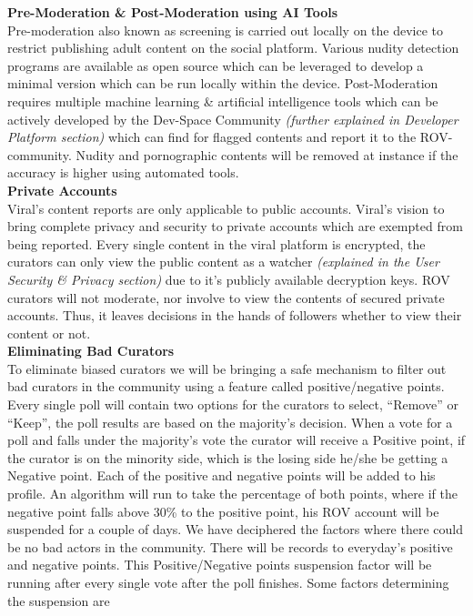 \documentclass[conference]{IEEEtran}
\begin{document}
\textbf{Pre-Moderation \& Post-Moderation using AI Tools}\\

Pre-moderation also known as screening is carried out locally on the device to restrict publishing adult content on the social platform. Various nudity detection programs are available as open source which can be leveraged to develop a minimal version which can be run locally within the device. Post-Moderation requires multiple machine learning \& artificial intelligence tools which can be actively developed by the Dev-Space Community \textit{(further explained in Developer Platform section)} which can find for flagged contents and report it to the ROV-community. Nudity and pornographic contents will be removed at instance if the accuracy is higher using automated tools.\\

\textbf{Private Accounts}\\

Viral’s content reports are only applicable to public accounts. Viral’s vision to bring complete privacy and security to private accounts which are exempted from being reported.  Every single content in the viral platform is encrypted, the curators can only view the public content as a watcher \textit{(explained in the User Security \& Privacy section)} due to it's publicly available decryption keys. ROV curators will not moderate, nor involve to view the contents of secured private accounts. Thus, it leaves decisions in the hands of followers whether to view their content or not. \\

\textbf{Eliminating Bad Curators}\\

To eliminate biased curators we will be bringing a safe mechanism to filter out bad curators in the community using a feature called positive/negative points. Every single poll will contain two options for the curators to select, “Remove” or “Keep”, the poll results are based on the majority’s decision. When a vote for a poll and falls under the majority’s vote the curator will receive a Positive point, if the curator is on the minority side, which is the losing side he/she be getting a Negative point. Each of the positive and negative points will be added to his profile. An algorithm will run to take the percentage of both points, where if the negative point falls above 30\% to the positive point, his ROV account will be suspended for a couple of days. We have deciphered the factors where there could be no bad actors in the community. There will be records to everyday's positive and negative points. This Positive/Negative points suspension factor will be running after every single vote after the poll finishes. Some factors determining the suspension are\\
\end{document}
